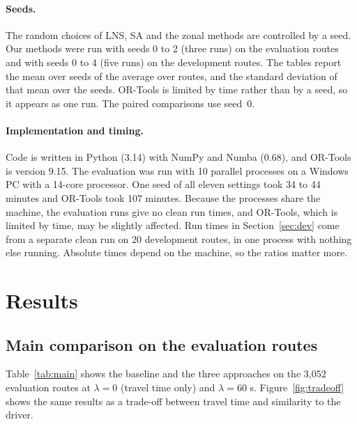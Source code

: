 \documentclass[11pt,a4paper]{article}
\begin{document}
\paragraph{Seeds.} The random choices of LNS, SA and the zonal methods are controlled by a seed. Our methods were run with seeds 0 to 2 (three runs) on the evaluation routes and with seeds 0 to 4 (five runs) on the development routes. The tables report the mean over seeds of the average over routes, and the standard deviation of that mean over the seeds. OR-Tools is limited by time rather than by a seed, so it appears as one run. The paired comparisons use seed~0.

\paragraph{Implementation and timing.} Code is written in Python (3.14) with NumPy and Numba (0.68), and OR-Tools is version 9.15. The evaluation was run with 10 parallel processes on a Windows PC with a 14-core processor. One seed of all eleven settings took 34 to 44 minutes and OR-Tools took 107 minutes. Because the processes share the machine, the evaluation runs give no clean run times, and OR-Tools, which is limited by time, may be slightly affected. Run times in Section~\ref{sec:dev} come from a separate clean run on 20 development routes, in one process with nothing else running. Absolute times depend on the machine, so the ratios matter more.

\section{Results}\label{sec:results}
\subsection{Main comparison on the evaluation routes}\label{sec:main}
Table~\ref{tab:main} shows the baseline and the three approaches on the 3,052 evaluation routes at $\lambda=0$ (travel time only) and $\lambda=60$ s. Figure~\ref{fig:tradeoff} shows the same results as a trade-off between travel time and similarity to the driver.

\begin{table}[t]
\centering\small
\caption{Results on the 3,052 evaluation routes, seeds 0 to 2 (mean $\pm$ standard deviation over seeds, OR-Tools one run). Travel time is relative to the driver's route (negative means less). The driver has 19.8 zone changes and official score 0 by definition. ``Order by zone routing'' and ``order from past routes'' are the two ways to choose the zone order (Section~\ref{sec:zonal}).}\label{tab:main}

\end{table}
\end{document}
